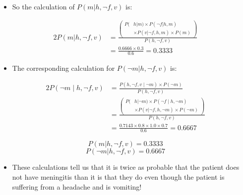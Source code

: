 \documentclass[xcolor={table}]{beamer}
\begin{document}
 \begin{frame} 
 \begin{itemize}
 	\item So the calculation of $P(m|h, \lnot f, v)$ is: 
\end{itemize}
\begin{alignat*}{2}
P(m| h, \lnot f, v)&=\frac{ \left(
\begin{aligned}
P(&h|m)  \times P(\lnot f|h,m)\\
&\times P(v|\lnot f, h,m) \times P(m)
\end{aligned}
\right)
}{P(h, \lnot f, v)}\\
&=\frac{0.6666 \times 0.3}{0.6}=0.3333
\end{alignat*}
\end{frame} 

 \begin{frame} 
 \begin{itemize}
 	\item The corresponding calculation for $P(\lnot m|h, \lnot f, v)$ is: 
\end{itemize}
\begin{alignat*}{2}
P(\lnot m \mid h, \lnot f, v)&=\frac{
P(h, \lnot f, v\mid \lnot m) \times P(\lnot m)
}{P(h, \lnot f, v)}\\
&=\frac{ \left(
\begin{aligned}
P(&h|\lnot m)  \times P(\lnot f\mid h,\lnot m)\\
&\times P(v|\lnot f, h,\lnot m) \times P(\lnot m)
\end{aligned} 
\right)
}{P(h, \lnot f, v)}\\
&=\frac{0.7143 \times 0.8 \times 1.0 \times 0.7}{0.6}=0.6667
\end{alignat*}
\end{frame} 

\begin{frame}
\begin{equation*}
P(m| h, \lnot f, v)=0.3333
\end{equation*}
\begin{equation*}
P(\lnot m| h, \lnot f, v)=0.6667
\end{equation*}
	\begin{itemize}
		\item These calculations tell us that it is twice as probable that the patient does not have meningitis than it is that they do even though the patient is suffering from a headache and is vomiting!
	\end{itemize}
\end{frame}
\end{document}
